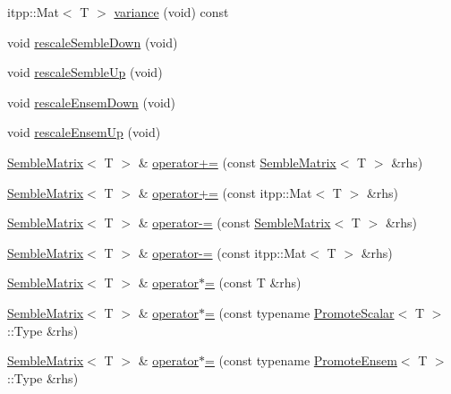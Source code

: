 \begin{DoxyCompactItemize}
\item 
itpp\+::\+Mat$<$ T $>$ \mbox{\hyperlink{structSEMBLE_1_1SembleMatrix_a00415604d082cee224aaf70367977b40}{variance}} (void) const
\item 
void \mbox{\hyperlink{structSEMBLE_1_1SembleMatrix_a4d2124fd0ca69d6e0759080eb4aec67b}{rescale\+Semble\+Down}} (void)
\item 
void \mbox{\hyperlink{structSEMBLE_1_1SembleMatrix_a7015574fba80f7dbabb0501567c5b58c}{rescale\+Semble\+Up}} (void)
\item 
void \mbox{\hyperlink{structSEMBLE_1_1SembleMatrix_a8073a3547ac8aa58aa4c76a11328d776}{rescale\+Ensem\+Down}} (void)
\item 
void \mbox{\hyperlink{structSEMBLE_1_1SembleMatrix_a6c6da8677941f6422d30c582f6fd87c0}{rescale\+Ensem\+Up}} (void)
\item 
\mbox{\hyperlink{structSEMBLE_1_1SembleMatrix}{Semble\+Matrix}}$<$ T $>$ \& \mbox{\hyperlink{structSEMBLE_1_1SembleMatrix_a76423cb9bf22b03e432cf612f395c404}{operator+=}} (const \mbox{\hyperlink{structSEMBLE_1_1SembleMatrix}{Semble\+Matrix}}$<$ T $>$ \&rhs)
\item 
\mbox{\hyperlink{structSEMBLE_1_1SembleMatrix}{Semble\+Matrix}}$<$ T $>$ \& \mbox{\hyperlink{structSEMBLE_1_1SembleMatrix_a88d796467ab566d47c31aa9bbff09356}{operator+=}} (const itpp\+::\+Mat$<$ T $>$ \&rhs)
\item 
\mbox{\hyperlink{structSEMBLE_1_1SembleMatrix}{Semble\+Matrix}}$<$ T $>$ \& \mbox{\hyperlink{structSEMBLE_1_1SembleMatrix_a74f00dfff31b8befe21919b1147218d2}{operator-\/=}} (const \mbox{\hyperlink{structSEMBLE_1_1SembleMatrix}{Semble\+Matrix}}$<$ T $>$ \&rhs)
\item 
\mbox{\hyperlink{structSEMBLE_1_1SembleMatrix}{Semble\+Matrix}}$<$ T $>$ \& \mbox{\hyperlink{structSEMBLE_1_1SembleMatrix_a51fc6327be31b88c5478f4a4418aaa92}{operator-\/=}} (const itpp\+::\+Mat$<$ T $>$ \&rhs)
\item 
\mbox{\hyperlink{structSEMBLE_1_1SembleMatrix}{Semble\+Matrix}}$<$ T $>$ \& \mbox{\hyperlink{structSEMBLE_1_1SembleMatrix_ac332d2c0b52d2727a4159a7a876d7e39}{operator$\ast$=}} (const T \&rhs)
\item 
\mbox{\hyperlink{structSEMBLE_1_1SembleMatrix}{Semble\+Matrix}}$<$ T $>$ \& \mbox{\hyperlink{structSEMBLE_1_1SembleMatrix_a3ef3830b0983652f9a25811ab7180357}{operator$\ast$=}} (const typename \mbox{\hyperlink{structSEMBLE_1_1PromoteScalar}{Promote\+Scalar}}$<$ T $>$\+::Type \&rhs)
\item 
\mbox{\hyperlink{structSEMBLE_1_1SembleMatrix}{Semble\+Matrix}}$<$ T $>$ \& \mbox{\hyperlink{structSEMBLE_1_1SembleMatrix_a174956301b0911918f9ea9e1fde610dd}{operator$\ast$=}} (const typename \mbox{\hyperlink{structSEMBLE_1_1PromoteEnsem}{Promote\+Ensem}}$<$ T $>$\+::Type \&rhs)

\end{DoxyCompactItemize}
